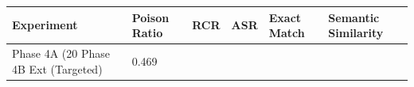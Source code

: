 \begin{tabular}{llllll}
\toprule
Experiment & Poison Ratio & RCR & ASR & Exact Match & Semantic Similarity \\
\midrule
Phase 4A (20%
Phase 4B Ext (Targeted) & 0.469%
\bottomrule
\end{tabular}
